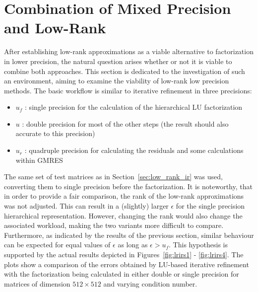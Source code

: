 \section{Combination of Mixed Precision and Low-Rank}
\label{sec:combination}

After establishing low-rank approximations as a viable alternative to factorization in lower precision, the natural question arises whether or not it is viable to combine both approaches. This section is dedicated to the investigation of such an environment, aiming to examine the viability of low-rank low precision methods. The basic workflow is similar to iterative refinement in three precisions:
\begin{itemize}
    \item $u_f$ : single precision for the calculation of the hierarchical LU factorization
     \item $u$ : double precision for most of the other steps (the result should also accurate to this precision)
     \item $u_r$ : quadruple precision for calculating the residuals and some calculations within GMRES
\end{itemize}

\noindent The same set of test matrices as in Section~\hyperref[sec:low_rank_ir]{\ref{sec:low_rank_ir}} was used, converting them to single precision before the factorization. It is noteworthy, that in order to provide a fair comparison, the rank of the low-rank approximations was not adjusted. This can result in a (slightly) larger $\epsilon$ for the single precision hierarchical representation. However, changing the rank would also change the associated workload, making the two variants more difficult to compare. Furthermore, as indicated by the results of the previous section, similar behaviour can be expected for equal values of $\epsilon$ as long as $\epsilon > u_f$. This hypothesis is supported by the actual results depicted in Figures~\hyperref[fig:lrirs1]{\ref{fig:lrirs1}} - \hyperref[fig:lrirs4]{\ref{fig:lrirs4}}. The plots show a comparison of the errors obtained by LU-based iterative refinement with the factorization being calculated in either double or single precision for matrices of dimension $512 \times 512$ and varying condition number.

